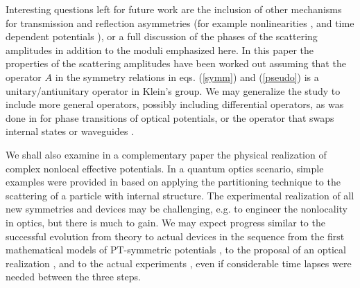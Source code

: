 Interesting questions left for future work are  the inclusion of other mechanisms for transmission and reflection asymmetries (for example
nonlinearities \cite{Xu2014,Konotop2016}, and  time dependent potentials \cite{Yu2009,Longhi2017}),
or a full discussion of the phases of the scattering amplitudes
in addition to the moduli emphasized here. In this paper the properties of the scattering amplitudes have been worked out assuming that the operator $A$ in the symmetry relations in eqs. (\ref{symm}) and (\ref{pseudo}) is a unitary/antiunitary operator in Klein's group.
We may generalize the study to include more general operators, possibly including differential operators, as was done in \cite{Konotop2017} for phase transitions of optical potentials, or the operator that swaps internal states or waveguides \cite{Kartashov2014,Zezyulin2017}.

We shall also examine in a complementary paper the physical realization of complex nonlocal effective potentials.
In a quantum optics scenario, simple examples were provided in \cite{Ruschhaupt2004a} based on applying the partitioning technique \cite{Feshbach1958,Feshbach1962}
to the scattering of a particle with internal structure. The experimental realization
of all new symmetries and devices may be challenging, e.g. to engineer the nonlocality in optics,
but there is much to gain.  We may expect progress similar to
the successful evolution from theory to actual devices in the sequence from the first mathematical
models of PT-symmetric potentials \cite{Bender1998}, to the proposal of an optical realization \cite{Ruschhaupt2005}, and to the actual experiments \cite{Guo2009},  even if considerable time lapses were needed between the three steps.
%
